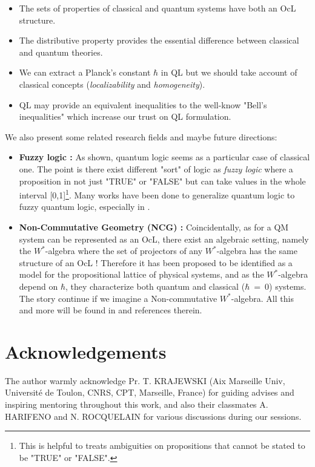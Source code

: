 \documentclass[12pt]{article}
\begin{document}
\begin{itemize}
\item The sets of properties of classical and quantum systems have both an OcL structure.
\item The distributive property provides the essential difference between classical and quantum theories. 
\item We can extract a Planck's constant $\hbar$ in QL but we should take account of classical concepts (\textit{localizability} and \textit{homogeneity}).
\item QL may provide an equivalent inequalities to the well-know "Bell's inequalities" which increase our trust on QL formulation.
\end{itemize}

We also present some related research fields and maybe future directions:

\begin{itemize}
\item \textbf{Fuzzy logic :} As shown, quantum logic seems as a particular case of classical one. The point is there exist different "sort" of logic as \textit{fuzzy logic} where a proposition in not just "TRUE" or "FALSE" but can take values in the whole interval [0,1]\footnote{This is helpful to treats ambiguities on propositions that cannot be stated to be "TRUE" or "FALSE".}. Many works have been done to generalize quantum logic to fuzzy quantum logic, especially in \cite{fuzzy3,pavicic2009quantum,pykacz1987quantum,pykacz1994fuzzy}.
\item \textbf{Non-Commutative Geometry (NCG) :} Coincidentally, as for a QM system can be represented as an OcL, there exist an algebraic setting, namely the $W^*$-algebra where the set of projectors of any $W^*$-algebra has the same structure of an OcL ! Therefore it has been proposed to be identified as a model for the propositional lattice of physical systems, and as the $W^*$-algebra depend on $\hbar$, they characterize both quantum and classical ($\hbar~=~0$) systems. The story continue if we imagine a Non-commutative $W^*$-algebra. All this and more will be found in \cite{marchetti2007quantum} and references therein.
\end{itemize}

\vspace{-1cm}
\section*{Acknowledgements}
\vspace{-0.2cm}

The author warmly acknowledge Pr. T. KRAJEWSKI (Aix Marseille Univ, Universit\'e de Toulon, CNRS, CPT, Marseille, France) for guiding advises and inspiring mentoring throughout this work, and also their classmates A. HARIFENO and N. ROCQUELAIN for various discussions during our sessions.

\vspace{0.5cm}
\begin{small}
\vspace{-0.2cm}
{
\fontsize{2pt}{0.2cm}\selectfont
\printbibliography}
\end{small}
\end{document}
